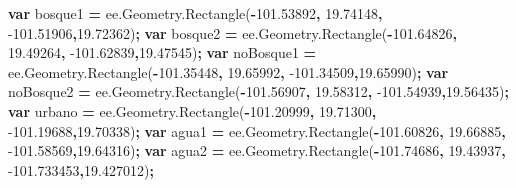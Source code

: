 \documentclass[
]{article}
\newenvironment{Shaded}{\begin{snugshade}}{\end{snugshade}}
\newcommand{\AttributeTok}[1]{\textcolor[rgb]{0.77,0.63,0.00}{#1}}
\newcommand{\FloatTok}[1]{\textcolor[rgb]{0.00,0.00,0.81}{#1}}
\newcommand{\KeywordTok}[1]{\textcolor[rgb]{0.13,0.29,0.53}{\textbf{#1}}}
\newcommand{\NormalTok}[1]{#1}
\newcommand{\OperatorTok}[1]{\textcolor[rgb]{0.81,0.36,0.00}{\textbf{#1}}}
\newcommand{\VariableTok}[1]{\textcolor[rgb]{0.00,0.00,0.00}{#1}}
\begin{document}
\begin{Shaded}
\begin{Highlighting}[]
\KeywordTok{var}\NormalTok{ bosque1 }\OperatorTok{=} \VariableTok{ee}\NormalTok{.}\VariableTok{Geometry}\NormalTok{.}\AttributeTok{Rectangle}\NormalTok{(}\OperatorTok{-}\FloatTok{101.53892}\OperatorTok{,} \FloatTok{19.74148}\OperatorTok{,} 
  \FloatTok{-101.51906}\OperatorTok{,}\FloatTok{19.72362}\NormalTok{)}\OperatorTok{;}
\KeywordTok{var}\NormalTok{ bosque2 }\OperatorTok{=} \VariableTok{ee}\NormalTok{.}\VariableTok{Geometry}\NormalTok{.}\AttributeTok{Rectangle}\NormalTok{(}\OperatorTok{-}\FloatTok{101.64826}\OperatorTok{,} \FloatTok{19.49264}\OperatorTok{,} 
  \FloatTok{-101.62839}\OperatorTok{,}\FloatTok{19.47545}\NormalTok{)}\OperatorTok{;}
\KeywordTok{var}\NormalTok{ noBosque1 }\OperatorTok{=} \VariableTok{ee}\NormalTok{.}\VariableTok{Geometry}\NormalTok{.}\AttributeTok{Rectangle}\NormalTok{(}\OperatorTok{-}\FloatTok{101.35448}\OperatorTok{,} \FloatTok{19.65992}\OperatorTok{,} 
  \FloatTok{-101.34509}\OperatorTok{,}\FloatTok{19.65990}\NormalTok{)}\OperatorTok{;}
\KeywordTok{var}\NormalTok{ noBosque2 }\OperatorTok{=} \VariableTok{ee}\NormalTok{.}\VariableTok{Geometry}\NormalTok{.}\AttributeTok{Rectangle}\NormalTok{(}\OperatorTok{-}\FloatTok{101.56907}\OperatorTok{,} \FloatTok{19.58312}\OperatorTok{,} 
  \FloatTok{-101.54939}\OperatorTok{,}\FloatTok{19.56435}\NormalTok{)}\OperatorTok{;}
\KeywordTok{var}\NormalTok{ urbano }\OperatorTok{=} \VariableTok{ee}\NormalTok{.}\VariableTok{Geometry}\NormalTok{.}\AttributeTok{Rectangle}\NormalTok{(}\OperatorTok{-}\FloatTok{101.20999}\OperatorTok{,} \FloatTok{19.71300}\OperatorTok{,} 
  \FloatTok{-101.19688}\OperatorTok{,}\FloatTok{19.70338}\NormalTok{)}\OperatorTok{;}
\KeywordTok{var}\NormalTok{ agua1 }\OperatorTok{=} \VariableTok{ee}\NormalTok{.}\VariableTok{Geometry}\NormalTok{.}\AttributeTok{Rectangle}\NormalTok{(}\OperatorTok{-}\FloatTok{101.60826}\OperatorTok{,} \FloatTok{19.66885}\OperatorTok{,} 
  \FloatTok{-101.58569}\OperatorTok{,}\FloatTok{19.64316}\NormalTok{)}\OperatorTok{;}
\KeywordTok{var}\NormalTok{ agua2 }\OperatorTok{=} \VariableTok{ee}\NormalTok{.}\VariableTok{Geometry}\NormalTok{.}\AttributeTok{Rectangle}\NormalTok{(}\OperatorTok{-}\FloatTok{101.74686}\OperatorTok{,} \FloatTok{19.43937}\OperatorTok{,} 
  \FloatTok{-101.733453}\OperatorTok{,}\FloatTok{19.427012}\NormalTok{)}\OperatorTok{;}


\end{Highlighting}
\end{Shaded}
\end{document}
